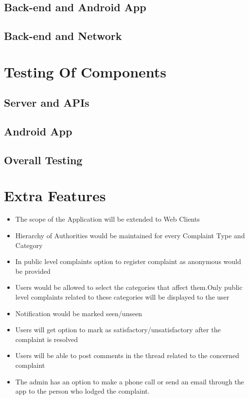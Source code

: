 \documentclass{article}
\begin{document}
			\subsection{Back-end and Android App}
			\subsection{Back-end and Network}
	
	\section{Testing Of Components}
			\subsection{Server and APIs}
			\subsection{Android App}
			\subsection{Overall Testing}
	
	\section{Extra Features}
	\begin{itemize}
	\item The scope of the Application will be extended to Web Clients
	\item Hierarchy of Authorities would be maintained for every Complaint Type and Category
	\item In public level complaints option to register complaint as anonymous would be provided
	\item Users would be allowed to select the categories that affect them.Only public level complaints related to these categories will be displayed to the user
	\item Notification would be marked seen/unseen
	\item Users will get option to mark as satisfactory/unsatisfactory after the complaint is resolved
	\item Users will be able to post comments in the thread related to the concerned complaint
	\item The admin has an option to make a phone call or send an email through the app to the person who lodged the complaint.
	\end{itemize}
\end{document}
